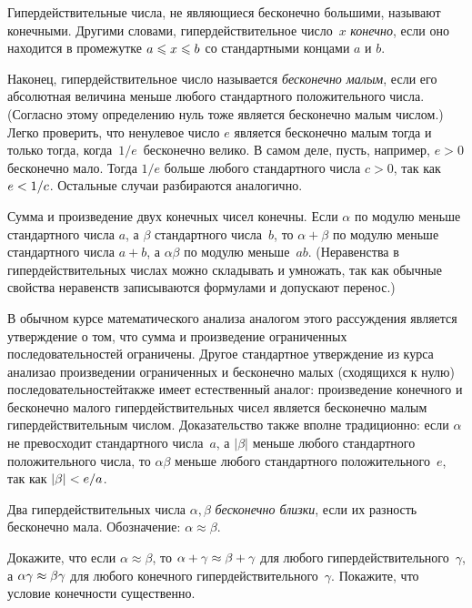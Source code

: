 Гипердействительные числа, не являющиеся бесконечно большими,
называют конечными. Другими словами, гипердействительное
число~$x$ \emph{конечно},%
%
если оно находится в
промежутке $a\hm\le x\hm\le b$ со стандартными концами $a$ и
$b$.

Наконец, гипердействительное число называется \emph{бесконечно
малым},%
%
если его абсолютная величина меньше любого стандартного
положительного числа. (Согласно этому определению нуль тоже
является бесконечно малым числом.) Легко проверить, что
ненулевое число $e$ является бесконечно малым тогда и только
тогда, когда~$1/e$~бесконечно велико. В самом деле, пусть,
например, $e>0$ бесконечно мало. Тогда $1/e$ больше любого
стандартного числа $c>0$, так как $e\hm<1/c$. Остальные случаи
разбираются аналогично.

Сумма и произведение двух конечных чисел конечны. Если $\alpha$
по модулю меньше стандартного числа $a$, а $\beta$\т
стандартного числа~$b$, то $\alpha+\beta$ по модулю меньше
стандартного числа $a+b$, а $\alpha\beta$ по модулю меньше~$ab$.
(Неравенства в гипердействительных числах можно складывать и
умножать, так как обычные свойства неравенств записываются
формулами и допускают перенос.)

В обычном курсе математического анализа аналогом этого
рассуждения является утверждение о том, что сумма и произведение
ограниченных последовательностей ограничены. Другое стандартное
утверждение из курса анализа\т о произведении ограниченных и
бесконечно малых (сходящихся к нулю) последовательностей\т также
имеет естественный аналог: произведение конечного и бесконечно
малого гипердействительных чисел является бесконечно малым
гипердействительным числом. Доказательство также вполне
традиционно: если $\alpha$ не превосходит стандартного
числа~$a$, а $|\beta|$ меньше любого стандартного положительного
числа, то $\alpha\beta$ меньше любого стандартного
положительного~$e$, так как $|\beta|\hm<e/a$.

Два гипердействительных числа $\alpha,\beta$ 
\emph{бесконечно близки},%
%
если их разность бесконечно мала.
Обозначение: $\alpha\approx\beta$.

\begin{problem}
Докажите, что если $\alpha\approx\beta$, то
$\alpha+\gamma\hm\approx\beta+\gamma$ для любого
гипердействительного~$\gamma$, а
$\alpha\gamma\hm\approx\beta\gamma$ для любого конечного
гипердействительного~$\gamma$. Покажите, что условие конечности
существенно.
\end{problem}


